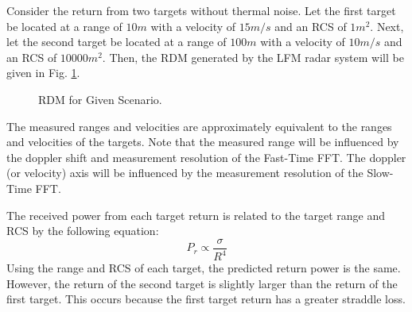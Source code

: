\documentclass[conference]{IEEEtran}
\begin{document}
\par
Consider the return from two targets without thermal noise. Let the first target be located at a range of $10m$ with a velocity of $15m/s$ and an RCS of $1m^2$. Next, let the second target be located at a range of $100m$ with a velocity of $10m/s$ and an RCS of $10000m^2$. Then, the RDM generated by the LFM radar system will be given in Fig. \ref{RDM0}.
\begin{figure}[H]
\centerline{}
\caption{RDM for Given Scenario.}
\label{RDM0}
\end{figure}
The measured ranges and velocities are approximately equivalent to the ranges and velocities of the targets. Note that the measured range will be influenced by the doppler shift and measurement resolution of the Fast-Time FFT. The doppler (or velocity) axis will be influenced by the measurement resolution of the Slow-Time FFT.
\par
The received power from each target return is related to the target range and RCS by the following equation:
\begin{equation}
P_r \propto \frac{\sigma}{R^4}
\end{equation}
Using the range and RCS of each target, the predicted return power is the same. However, the return of the second target is slightly larger than the return of the first target. This occurs because the first target return has a greater straddle loss.
\end{document}
